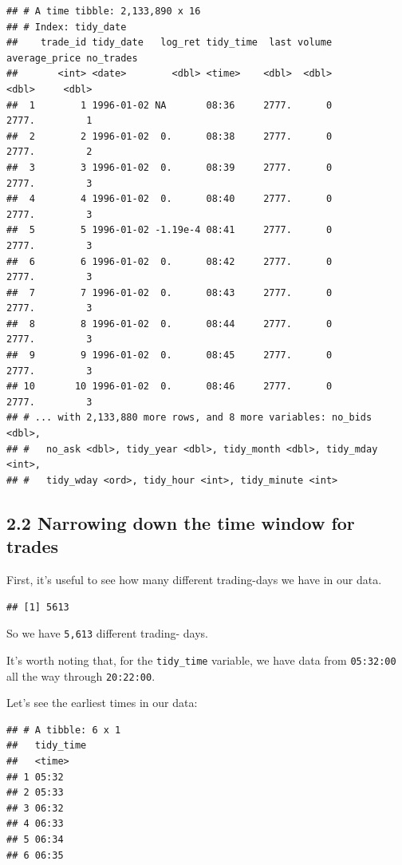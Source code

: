 \documentclass[]{elsarticle} %
\begin{document}
\begin{verbatim}
## # A time tibble: 2,133,890 x 16
## # Index: tidy_date
##    trade_id tidy_date   log_ret tidy_time  last volume average_price no_trades
##       <int> <date>        <dbl> <time>    <dbl>  <dbl>         <dbl>     <dbl>
##  1        1 1996-01-02 NA       08:36     2777.      0         2777.         1
##  2        2 1996-01-02  0.      08:38     2777.      0         2777.         2
##  3        3 1996-01-02  0.      08:39     2777.      0         2777.         3
##  4        4 1996-01-02  0.      08:40     2777.      0         2777.         3
##  5        5 1996-01-02 -1.19e-4 08:41     2777.      0         2777.         3
##  6        6 1996-01-02  0.      08:42     2777.      0         2777.         3
##  7        7 1996-01-02  0.      08:43     2777.      0         2777.         3
##  8        8 1996-01-02  0.      08:44     2777.      0         2777.         3
##  9        9 1996-01-02  0.      08:45     2777.      0         2777.         3
## 10       10 1996-01-02  0.      08:46     2777.      0         2777.         3
## # ... with 2,133,880 more rows, and 8 more variables: no_bids <dbl>,
## #   no_ask <dbl>, tidy_year <dbl>, tidy_month <dbl>, tidy_mday <int>,
## #   tidy_wday <ord>, tidy_hour <int>, tidy_minute <int>
\end{verbatim}

\hypertarget{narrowing-down-the-time-window-for-trades}{%
\subsection{2.2 Narrowing down the time window for
trades}\label{narrowing-down-the-time-window-for-trades}}

First, it's useful to see how many different trading-days we have in our
data.

\begin{verbatim}
## [1] 5613
\end{verbatim}

So we have \texttt{5,613} different trading- days.

It's worth noting that, for the \texttt{tidy\_time} variable, we have
data from \texttt{05:32:00} all the way through \texttt{20:22:00}.

Let's see the earliest times in our data:

\begin{verbatim}
## # A tibble: 6 x 1
##   tidy_time
##   <time>   
## 1 05:32    
## 2 05:33    
## 3 06:32    
## 4 06:33    
## 5 06:34    
## 6 06:35
\end{verbatim}
\end{document}
